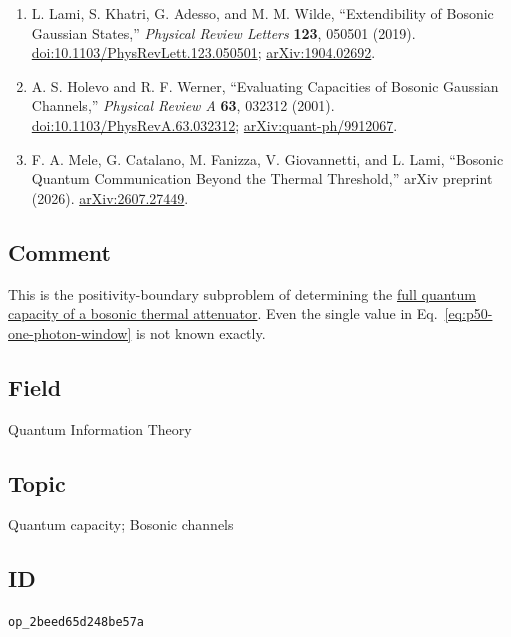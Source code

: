 \begin{enumerate}[label={},leftmargin=4.8em,labelsep=0.5em]
  \footnotesize
  \item[\textup{[LKA+19]}]\label{ref:p50-lami-et-al}
  L. Lami, S. Khatri, G. Adesso, and M. M. Wilde,
  ``Extendibility of Bosonic Gaussian States,''
  \emph{Physical Review Letters} \textbf{123}, 050501 (2019).
  \href{https://doi.org/10.1103/PhysRevLett.123.050501}{doi:10.1103/PhysRevLett.123.050501};
  \href{https://arxiv.org/abs/1904.02692}{arXiv:1904.02692}.

  \item[\textup{[HW01]}]\label{ref:p50-holevo-werner}
  A. S. Holevo and R. F. Werner,
  ``Evaluating Capacities of Bosonic Gaussian Channels,''
  \emph{Physical Review A} \textbf{63}, 032312 (2001).
  \href{https://doi.org/10.1103/PhysRevA.63.032312}{doi:10.1103/PhysRevA.63.032312};
  \href{https://arxiv.org/abs/quant-ph/9912067}{arXiv:quant-ph/9912067}.

  \item[\textup{[MCF+26]}]\label{ref:p50-mele-et-al}
  F. A. Mele, G. Catalano, M. Fanizza, V. Giovannetti, and L. Lami,
  ``Bosonic Quantum Communication Beyond the Thermal Threshold,''
  arXiv preprint (2026).
  \href{https://arxiv.org/abs/2607.27449}{arXiv:2607.27449}.
\end{enumerate}

\subsection*{Comment}

This is the positivity-boundary subproblem of determining the
\href{https://qiqc-op.com/problem/op_9209e4eb15586dec/}{full quantum capacity of a bosonic thermal attenuator}.  Even the single value in
Eq.~\eqref{eq:p50-one-photon-window} is not known exactly.

\subsection*{Field}

Quantum Information Theory

\subsection*{Topic}

Quantum capacity; Bosonic channels

\subsection*{ID}

\texttt{op\_2beed65d248be57a}
